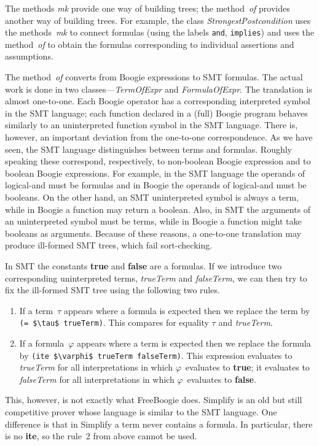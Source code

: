 \documentclass{llncs}
\newcommand{\smtCode}{\lstinline[style=smt,basicstyle=\normalsize]}
\begin{document}
The methods \textit{mk} provide one way of building trees; the
method~\textit{of} provides another way of building trees.
For example, the class \textit{StrongestPostcondition} uses
the methods~\textit{mk} to connect formulas (using the labels
\texttt{and}, \texttt{implies}) and uses the method~\textit{of}
to obtain the formulas corresponding to individual assertions and
assumptions.

The method~\textit{of} converts from Boogie expressions
to SMT formulas. The actual work is done in two
classes---\textit{TermOfExpr} and \textit{FormulaOfExpr}. The
translation is almost one-to-one. Each Boogie operator has a
corresponding interpreted symbol in the SMT language; each
function declared in a (full) Boogie program behaves similarly
to an uninterpreted function symbol in the SMT language.
There is, however, an important deviation from the one-to-one
correspondence. As we have seen, the SMT language distinguishes
between terms and formulas. Roughly speaking these correspond,
respectively, to non-boolean Boogie expression and to boolean
Boogie expressions. For example, in the SMT language the
operands of logical-and must be formulas and in Boogie the
operands of logical-and must be booleans. On the other hand, an
SMT uninterpreted symbol is always a term, while in Boogie a
function may return a boolean. Also, in SMT the arguments of an
uninterpreted symbol must be terms, while in Boogie a function
might take booleans as arguments. Because of these reasons, a
one-to-one translation may produce ill-formed SMT trees, which
fail sort-checking.

In SMT the constants \textbf{true} and \textbf{false} are a
formulas. If we introduce two corresponding uninterpreted terms,
\textit{trueTerm} and \textit{falseTerm}, we can then try to fix
the ill-formed SMT tree using the following two rules.
\begin{enumerate}
\item If a term~$\tau$ appears where a formula is expected then we 
  replace the term by \smtCode|(= $\tau$ trueTerm)|. This compares
  for equality $\tau$ and \textit{trueTerm}.
\item If a formula~$\varphi$ appears where a term is expected
  then we replace the formula by 
  \smtCode|(ite $\varphi$ trueTerm falseTerm)|.
  This expression evaluates to \textit{trueTerm} for all 
  interpretations in which $\varphi$~evaluates to \textbf{true};
  it evaluates to \textit{falseTerm} for all interpretations
  in which $\varphi$~evaluates to \textbf{false}.
\end{enumerate}
This, however, is not exactly what FreeBoogie does.
Simplify is an old but still competitive prover whose language is
similar to the SMT language. One difference is that in Simplify
a term never contains a formula. In particular, there is no
\textbf{ite}, so the rule~2 from above cannot be used.
\end{document}
